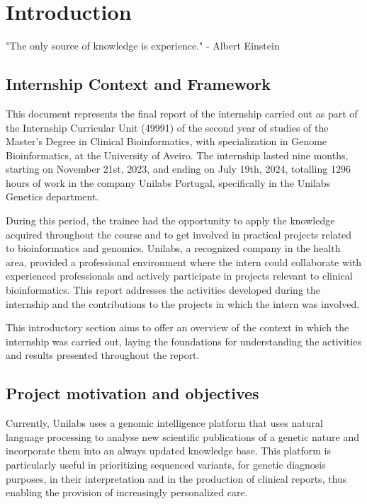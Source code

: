 \chapter{Introduction} 
\label{chapter:introduction}

\begin{introduction}
    "The only source of knowledge is experience." - Albert Einstein
\end{introduction}



\section{Internship Context and Framework} \label{sec:intro_context}

This document represents the final report of the internship carried out as part of the Internship Curricular Unit (49991) of the second year of studies of the Master's Degree in Clinical Bioinformatics, with specialization in Genome Bioinformatics, at the University of Aveiro. The internship lasted nine months, starting on November 21st, 2023, and ending on July 19th, 2024, totalling 1296 hours of work in the company Unilabs Portugal, specifically in the Unilabs Genetics department. 

During this period, the trainee had the opportunity to apply the knowledge acquired throughout the course and to get involved in practical projects related to bioinformatics and genomics. Unilabs, a recognized company in the health area, provided a professional environment where the intern could collaborate with experienced professionals and actively participate in projects relevant to clinical bioinformatics. This report addresses the activities developed during the internship and the contributions to the projects in which the intern was involved. 

This introductory section aims to offer an overview of the context in which the internship was carried out, laying the foundations for understanding the activities and results presented throughout the report.


\section{Project motivation and objectives} \label{sec:intro_motivation}

Currently, Unilabs uses a genomic intelligence platform that uses natural language processing to analyse new scientific publications of a genetic nature and incorporate them into an always updated knowledge base. This platform is particularly useful in prioritizing sequenced variants, for genetic diagnosis purposes, in their interpretation and in the production of clinical reports, thus enabling the provision of increasingly personalized care. 

